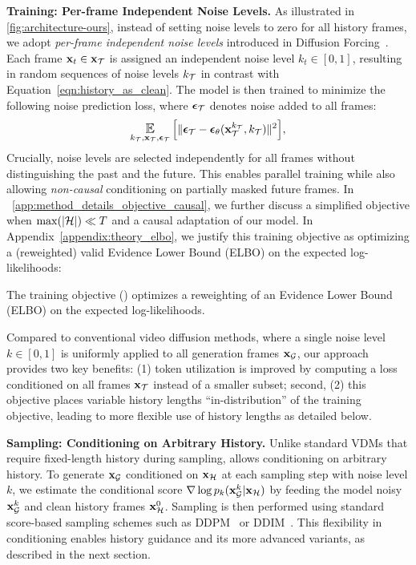 \textbf{Training: Per-frame Independent Noise Levels.} As illustrated in \cref{fig:architecture-ours}, instead of setting noise levels to zero for all history frames, we adopt \emph{per-frame independent noise levels} introduced in Diffusion Forcing~\cite{chen2024diffusion}. Each frame ${\mathbf{x}}_t \in {\mathbf{x}}_{\mathcal{T}}$ is assigned an independent noise level $k_t \in [0, 1]$, resulting in random sequences of noise levels $k_{{\mathcal{T}}}$ in contrast with Equation~\ref{eqn:history_as_clean}.
{}
The \mtd model is then trained to minimize the following noise prediction loss, where $\bm{\epsilon}_{\mathcal{T}}$ denotes noise added to all frames: 
\vspace{-5pt}
\begin{equation}
\label{eq:train}
\mathop{\mathlarger{\mathbb{E}}}_{\substack{k_{\cT}, \bx_\cT, \beps_\cT}}
\Big[\| \beps_\cT - \beps_\theta(\bx_\cT^{k_{\cT}},k_{\cT}) \|^2\Big],
\vspace{-5pt}
\end{equation}
 Crucially, noise levels are selected independently for all frames without distinguishing the past and the future. This enables parallel training while also allowing \emph{non-causal} conditioning on partially masked future frames. In ~\cref{app:method_details_objective_causal}, we further discuss a simplified objective when $\max(|{\mathcal{H}}|)\ll T$ and a causal adaptation of our model. 
{}
In Appendix~\ref{appendix:theory_elbo}, we justify this training objective as optimizing a (reweighted) valid Evidence Lower Bound (ELBO) on the expected log-likelihoods:
\begin{theorem}[Informal] 
    The \mtd training objective () optimizes a reweighting of an Evidence Lower Bound (ELBO) on the expected log-likelihoods. 
    \label{theorem:informal}
\end{theorem}
Compared to conventional video diffusion methods, where a single noise level $k \in [0,1]$  is uniformly applied to all generation frames ${\mathbf{x}_{\mathcal{G}}}$, our approach provides two key benefits: (1) token utilization is improved by computing a loss conditioned on all frames ${\mathbf{x}}_{{\mathcal{T}}}$ instead of a smaller subset; second, (2) this objective places variable history lengths ``in-distribution'' of the training objective, leading to more flexible use of history lengths as detailed below.  

\textbf{Sampling: Conditioning on Arbitrary History.} Unlike standard VDMs that require fixed-length history during sampling, \mtd allows conditioning on arbitrary history. To generate ${\mathbf{x}_{\mathcal{G}}}$ conditioned on ${\mathbf{x}_{\mathcal{H}}}$ at each sampling step with noise level $k$, we estimate the conditional score ${\nabla \log\,} p_k({\mathbf{x}_{\mathcal{G}}^{k}}|{\mathbf{x}_{\mathcal{H}}})$ by feeding the model noisy ${\mathbf{x}_{\mathcal{G}}^{k}}$ and clean history frames ${\mathbf{x}}^0_{{\mathcal{H}}}$. Sampling is then performed using standard score-based sampling schemes such as DDPM~\cite{ho2020denoising} or DDIM~\cite{ddim}. This flexibility in conditioning enables history guidance and its more advanced variants, as described in the next section.

